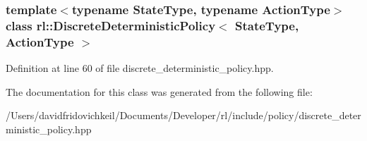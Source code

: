 \subsubsection*{template$<$typename State\+Type, typename Action\+Type$>$\newline
class rl\+::\+Discrete\+Deterministic\+Policy$<$ State\+Type, Action\+Type $>$}



Definition at line 60 of file discrete\+\_\+deterministic\+\_\+policy.\+hpp.



The documentation for this class was generated from the following file\+:\begin{DoxyCompactItemize}
\item 
/\+Users/davidfridovichkeil/\+Documents/\+Developer/rl/include/policy/discrete\+\_\+deterministic\+\_\+policy.\+hpp\end{DoxyCompactItemize}
